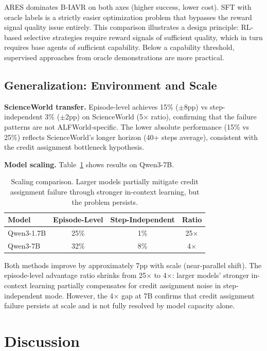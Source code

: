 \documentclass{article}
\begin{document}
ARES dominates B-IAVR on both axes (higher success, lower cost). SFT with oracle labels is a strictly easier optimization problem that bypasses the reward signal quality issue entirely. This comparison illustrates a design principle: RL-based selective strategies require reward signals of sufficient quality, which in turn requires base agents of sufficient capability. Below a capability threshold, supervised approaches from oracle demonstrations are more practical.

\subsection{Generalization: Environment and Scale}

\textbf{ScienceWorld transfer.} Episode-level achieves 15\% ($\pm$8pp) vs step-independent 3\% ($\pm$2pp) on ScienceWorld (5$\times$ ratio), confirming that the failure patterns are not ALFWorld-specific. The lower absolute performance (15\% vs 25\%) reflects ScienceWorld's longer horizon (40+ steps average), consistent with the credit assignment bottleneck hypothesis.

\textbf{Model scaling.} Table~\ref{tab:scaling} shows results on Qwen3-7B.

\begin{table}[h]
\centering
\caption{Scaling comparison. Larger models partially mitigate credit assignment failure through stronger in-context learning, but the problem persists.}
\label{tab:scaling}
\begin{tabular}{lccc}
\toprule
Model & Episode-Level & Step-Independent & Ratio \\
\midrule
Qwen3-1.7B & 25\% & 1\% & 25$\times$ \\
Qwen3-7B & 32\% & 8\% & 4$\times$ \\
\bottomrule
\end{tabular}
\end{table}

Both methods improve by approximately 7pp with scale (near-parallel shift). The episode-level advantage ratio shrinks from 25$\times$ to 4$\times$: larger models' stronger in-context learning partially compensates for credit assignment noise in step-independent mode. However, the 4$\times$ gap at 7B confirms that credit assignment failure persists at scale and is not fully resolved by model capacity alone.

\section{Discussion}
\end{document}
